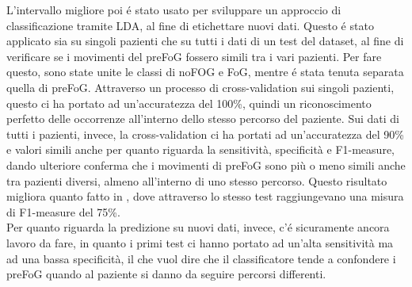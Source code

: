 L'intervallo migliore poi é stato usato per sviluppare un approccio di classificazione tramite LDA, al fine di etichettare nuovi dati. Questo é stato applicato sia su singoli pazienti che su tutti i dati di un test del dataset, al fine di verificare se i movimenti del preFoG fossero simili tra i vari pazienti. Per fare questo, sono state unite le classi di noFOG e FoG, mentre é stata tenuta separata quella di preFoG. Attraverso un processo di cross-validation sui singoli pazienti, questo ci ha portato ad un'accuratezza del 100\%, quindi un riconoscimento perfetto delle occorrenze all'interno dello stesso percorso del paziente. Sui dati di tutti i pazienti, invece, la cross-validation ci ha portati ad un'accuratezza del 90\% e valori simili anche per quanto riguarda la sensitività, specificità e F1-measure, dando ulteriore conferma che i movimenti di preFoG sono più o meno simili anche tra pazienti diversi, almeno all'interno di uno stesso percorso. Questo risultato migliora quanto fatto in \cite{12}, dove attraverso lo stesso test raggiungevano una misura di F1-measure del 75\%.\\
Per quanto riguarda la predizione su nuovi dati, invece, c'é sicuramente ancora lavoro da fare, in quanto i primi test ci hanno portato ad un'alta sensitività ma ad una bassa specificità, il che vuol dire che il classificatore tende a confondere i preFoG quando al paziente si danno da seguire percorsi differenti.
